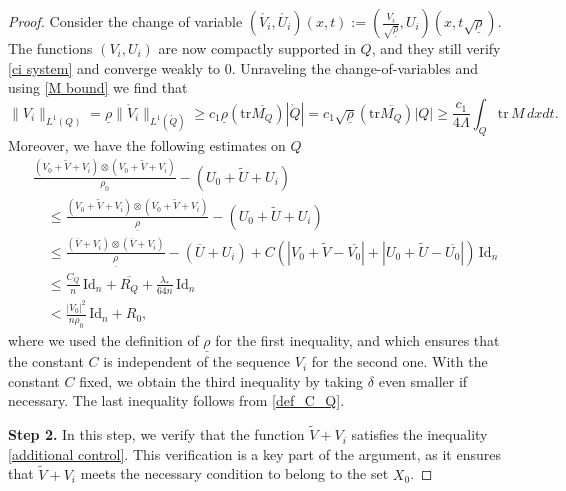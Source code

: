 \documentclass[12pt,reqno]{amsart}
\theoremstyle{definition}
\theoremstyle{remark}
\numberwithin{equation}{section}
\newcommand{\id}{\mathrm{Id}}
\newcommand{\trace}{\mathrm{tr}}
\begin{document}
\begin{proof}
Consider the change of variable $(\mathring{V_i}, \mathring{U_i})(x,t) := \left( \frac{V_i}{\sqrt{\underline{\rho}}}, U_i \right) (x, t\sqrt{\underline{\rho}})$. The functions $(V_i, U_i)$ are now compactly supported in $Q$, and they still verify \eqref{ci system} and converge weakly to 0. Unraveling the change-of-variables and using \eqref{M bound} we find that 
\begin{equation}\label{punch3}
\| V_i \|_{L^1(Q)} = \underline{\rho} \|\mathring V_i\|_{L^1(\mathring Q)} \ge c_1 \underline{\rho} (\trace   \overline{M_Q})|\mathring Q| = c_1 \sqrt{\underline{\rho}} (\trace   \overline{M_Q})|Q| \geq \frac{c_1}{4\Lambda} \int_Q \trace  \, M \, dx dt.
\end{equation}
Moreover, we have the following estimates on $Q$ 
\begin{equation}\label{condition1 of V+Vi}
\begin{split}
& \frac{(V_0+\widetilde{V}+V_i) \otimes (V_0+\widetilde{V}+V_i)}{\rho_0} - (U_0+\widetilde{U}+U_i) \\
& \quad \leq  \frac{(V_0+\widetilde{V}+V_i) \otimes (V_0+\widetilde{V}+V_i)}{\underline{\rho}} - (U_0+\widetilde{U}+U_i) \\
& \quad \leq  \frac{(\overline{V} +V_i) \otimes (\overline{V} +V_i)}{\underline{\rho}} - (\overline{U}+U_i) + C(|V_0+\widetilde{V}-\overline{V_0}| + |U_0+\widetilde{U}-\overline{U_0}|) \, \id_n \\
& \quad \leq  \frac{{C_Q}}{n} \, \id_n + \overline{R_Q} + \frac{\lambda_*}{64n} \, \id_n \\
& \quad < \frac{|V_0|^2}{n\rho_0} \, \id_n + R_0,
\end{split}
\end{equation}
where we used the definition of $\underline{\rho}$ for the first inequality, and \cite[Remark 2.2]{CVY} which ensures that the constant $C$ is independent of the sequence $V_i$ for the second one. With the constant $C$ fixed, we obtain the third inequality by taking $\delta$ even smaller if necessary. The last inequality follows from \eqref{def_C_Q}.

\textbf{Step 2.} In this step, we verify that the function $ \widetilde{V} + V_i $ satisfies the inequality \eqref{additional control}. This verification is a key part of the argument, as it ensures that $ \widetilde{V} + V_i $ meets the necessary condition to belong to the set $ X_0 $.


\end{proof}
\end{document}
